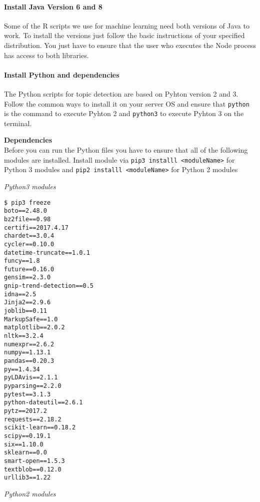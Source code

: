 \documentclass[]{article}
\let\oldparagraph\paragraph
\renewcommand{\paragraph}[1]{\oldparagraph{#1}\mbox{}}
\begin{document}
\paragraph{Install Java Version 6 and
8}\label{install-java-version-6-and-8}

Some of the R scripts we use for machine learning need both versions of
Java to work. To install the versions just follow the basic instructions
of your specified distribution. You just have to ensure that the user
who executes the Node process has access to both libraries.

\paragraph{Install Python and
dependencies}\label{install-python-and-dependencies}

The Python scripts for topic detection are based on Pyhton version 2 and
3. Follow the common ways to install it on your server OS and ensure
that \texttt{python} is the command to execute Pyhton 2 and
\texttt{python3} to execute Pyhton 3 on the terminal.

\textbf{Dependencies}\\
Before you can run the Python files you have to ensure that all of the
following modules are installed. Install module via
\texttt{pip3\ installl\ \textless{}moduleName\textgreater{}} for Python
3 modules and
\texttt{pip2\ installl\ \textless{}moduleName\textgreater{}} for Python
2 modules

\emph{Python3 modules}

\begin{verbatim}
$ pip3 freeze
boto==2.48.0
bz2file==0.98
certifi==2017.4.17
chardet==3.0.4
cycler==0.10.0
datetime-truncate==1.0.1
funcy==1.8
future==0.16.0
gensim==2.3.0
gnip-trend-detection==0.5
idna==2.5
Jinja2==2.9.6
joblib==0.11
MarkupSafe==1.0
matplotlib==2.0.2
nltk==3.2.4
numexpr==2.6.2
numpy==1.13.1
pandas==0.20.3
py==1.4.34
pyLDAvis==2.1.1
pyparsing==2.2.0
pytest==3.1.3
python-dateutil==2.6.1
pytz==2017.2
requests==2.18.2
scikit-learn==0.18.2
scipy==0.19.1
six==1.10.0
sklearn==0.0
smart-open==1.5.3
textblob==0.12.0
urllib3==1.22
\end{verbatim}

\emph{Python2 modules}
\end{document}
